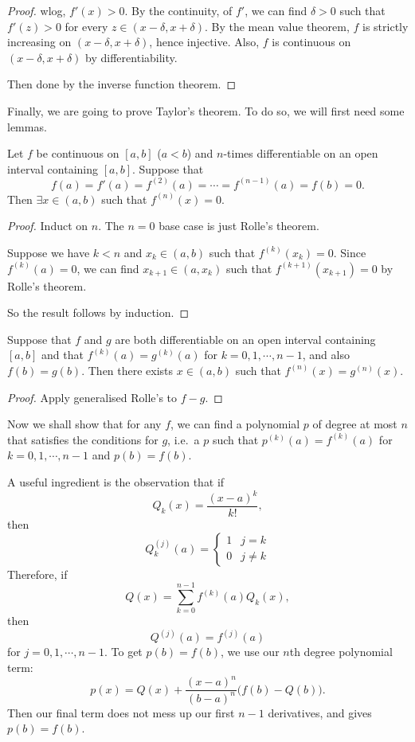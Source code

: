 \documentclass[a4paper]{article}
\begin{document}
\begin{proof}
  wlog, $f'(x) > 0$. By the continuity, of $f'$, we can find $\delta > 0$ such that $f'(z) > 0$ for every $z\in (x - \delta, x + \delta)$. By the mean value theorem, $f$ is strictly increasing on $(x - \delta, x + \delta)$, hence injective. Also, $f$ is continuous on $(x - \delta, x + \delta)$ by differentiability.

  Then done by the inverse function theorem.
\end{proof}

Finally, we are going to prove Taylor's theorem. To do so, we will first need some lemmas.
\begin{thm}
  Let $f$ be continuous on $[a, b]$ ($a < b$) and $n$-times differentiable on an open interval containing $[a, b]$. Suppose that
  \[
    f(a) = f'(a) = f^{(2)}(a) = \cdots = f^{(n - 1)}(a) = f(b) = 0.
  \]
  Then $\exists x\in (a, b)$ such that $f^{(n)}(x) = 0$.
\end{thm}

\begin{proof}
  Induct on $n$. The $n = 0$ base case is just Rolle's theorem.

  Suppose we have $k < n$ and $x_k\in (a, b)$ such that $f^{(k)}(x_k) = 0$. Since $f^{(k)}(a) = 0$, we can find $x_{k + 1}\in (a, x_k)$ such that $f^{(k + 1)}(x_{k + 1}) = 0$ by Rolle's theorem.

  So the result follows by induction.
\end{proof}

\begin{cor}
  Suppose that $f$ and $g$ are both differentiable on an open interval containing $[a, b]$ and that $f^{(k)}(a) = g^{(k)}(a)$ for $k = 0, 1, \cdots, n - 1$, and also $f(b) = g(b)$. Then there exists $x\in (a, b)$ such that $f^{(n)}(x) = g^{(n)}(x)$.
\end{cor}

\begin{proof}
  Apply generalised Rolle's to $f - g$.
\end{proof}

Now we shall show that for any $f$, we can find a polynomial $p$ of degree at most $n$ that satisfies the conditions for $g$, i.e.\ a $p$ such that $p^{(k)}(a) = f^{(k)}(a)$ for $k = 0, 1, \cdots, n - 1$ and $p(b) = f(b)$.

A useful ingredient is the observation that if
\[
  Q_k(x) = \frac{(x - a)^k}{k!},
\]
then
\[
  Q_k^{(j)}(a) =
  \begin{cases}
    1 & j = k\\
    0 & j \not= k
  \end{cases}
\]
Therefore, if
\[
  Q(x) = \sum_{k = 0}^{n - 1}f^{(k)}(a) Q_k(x),
\]
then
\[
  Q^{(j)}(a) = f^{(j)}(a)
\]
for $j = 0, 1, \cdots, n - 1$. To get $p(b) = f(b)$, we use our $n$th degree polynomial term:
\[
  p(x) = Q(x) + \frac{(x - a)^n}{(b - a)^n}\big(f(b) - Q(b)\big).
\]
Then our final term does not mess up our first $n - 1$ derivatives, and gives $p(b)= f(b)$.
\end{document}
